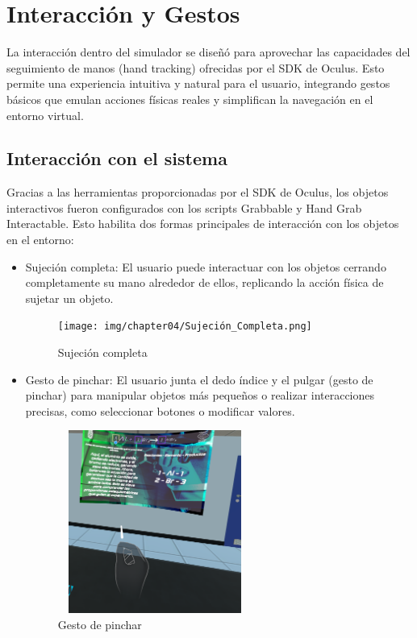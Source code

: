 \section{Interacción y Gestos}\label{sec:Gestos}
La interacción dentro del simulador se diseñó para aprovechar las capacidades del seguimiento de manos (hand tracking) ofrecidas por el SDK de Oculus. Esto permite una experiencia intuitiva y natural para el usuario, integrando gestos básicos que emulan acciones físicas reales y simplifican la navegación en el entorno virtual.

\subsection{Interacción con el sistema}
Gracias a las herramientas proporcionadas por el SDK de Oculus, los objetos interactivos fueron configurados con los scripts Grabbable y Hand Grab Interactable. Esto habilita dos formas principales de interacción con los objetos en el entorno:

\begin{itemize}
    \item Sujeción completa: El usuario puede interactuar con los objetos cerrando completamente su mano alrededor de ellos, replicando la acción física de sujetar un objeto.
    \begin{figure}[thbp]
        \centering
        \texttt{[image: img/chapter04/Sujeción\_Completa.png]}
        \caption{Sujeción completa}
        \label{fig:Sujeción_Completa}
    \end{figure}
    \item Gesto de pinchar: El usuario junta el dedo índice y el pulgar (gesto de pinchar) para manipular objetos más pequeños o realizar interacciones precisas, como seleccionar botones o modificar valores.
    \begin{figure}[thbp]
        \centering
        \includegraphics[width=0.6\textwidth, height = 6cm]{img/chapter04/Pinch.png}
        \caption{Gesto de pinchar}
        \label{fig:Pinchar}
    \end{figure}
\end{itemize}

